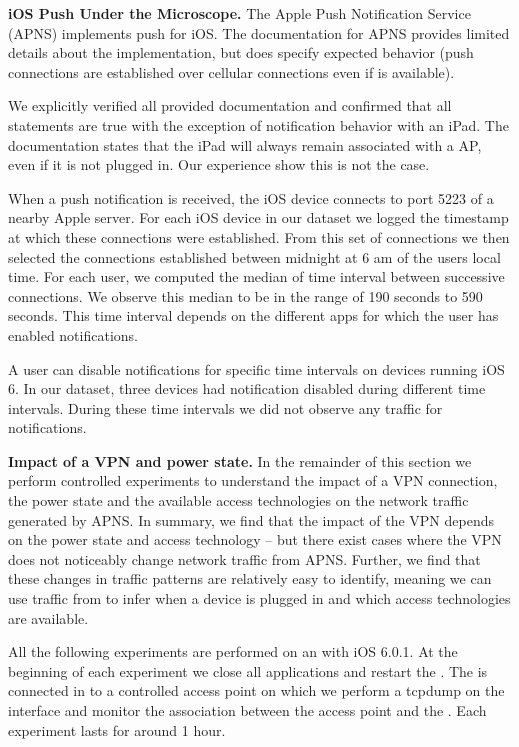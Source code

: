 \noindent \textbf{iOS Push Under the Microscope.} 
The Apple Push Notification Service 
(APNS) implements push for iOS. The documentation for APNS provides limited details about 
the implementation, but does specify expected behavior (\eg push 
connections are established over cellular connections even if 
\wifi is available). 

We explicitly verified all provided documentation and confirmed that 
all statements are true with the exception of notification behavior 
with an iPad. The documentation states that the iPad will always 
remain associated with a \wifi AP, even if it is not plugged in. Our 
experience show this is not the case.

When a push notification is received, the iOS device connects to port
5223 of a nearby Apple server. For each iOS device in our dataset we
logged the timestamp at which these connections were established. From
this set of connections we then selected the connections established
between midnight at 6 am of the users local time. For each user, we
computed the median of time interval between successive
connections. We observe this median to be in the range of 190 seconds
to 590 seconds. This time interval depends on the different apps for
which the user has enabled notifications. 

A user can disable notifications for specific time intervals on
devices running iOS 6. In our dataset, three devices had notification
disabled during different time intervals. During these time intervals
we did not observe any traffic for notifications.

\noindent\textbf{Impact of a VPN and power state.}
In the remainder of this section we perform controlled experiments 
to understand the impact of a VPN connection, the power state and 
the available access technologies on the network traffic generated 
by APNS. In summary, we find that the impact of the VPN depends 
on the power state and access technology -- but there exist cases 
where the VPN does not noticeably change network traffic from APNS.
Further, we find that these changes in traffic patterns are relatively 
easy to identify, meaning we can use traffic from \meddle to infer 
when a device is plugged in and which access technologies are 
available.

All the following experiments are performed on an  with iOS
6.0.1.  At the beginning of each experiment we close all applications
and restart the \iphone{}. The \iphone{} is connected in \wifi{} to a
controlled access point on which we perform a tcpdump on the \wifi{}
interface and monitor the \wifi{} association between the access point
and the \iphone{}. Each experiment lasts for around 1 hour. 

